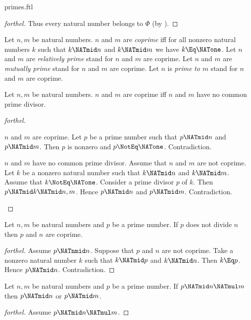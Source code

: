 \documentclass{stex}
\begin{document}
\begin{smodule}{primes.ftl}
\begin{proof}[forthel]
  Thus every natural number belongs to $\Phi$ (by ).
\end{proof}

\begin{definition}[forthel,for={coprime,relatively prime,mutually prime}]
  Let $n, m$ be natural numbers.
  $n$ and $m$ are \emph{coprime} iff for all nonzero natural numbers $k$ such that $k \NATmid n$ and $k \NATmid m$ we have $k \Eq \NATone$.
  Let $n$ and $m$ are \emph{relatively prime} stand for $n$ and $m$ are coprime.
  Let $n$ and $m$ are \emph{mutually prime} stand for $n$ and $m$ are coprime.
  Let $n$ is \emph{prime to $m$} stand for $n$ and $m$ are coprime.
\end{definition}

\begin{proposition}[forthel]
  Let $n, m$ be natural numbers.
  $n$ and $m$ are coprime iff $n$ and $m$ have no common prime divisor.
\end{proposition}
\begin{proof}[forthel]
  \begin{case}{$n$ and $m$ are coprime.}
    Let $p$ be a prime number such that $p \NATmid n$ and $p \NATmid m$.
    Then $p$ is nonzero and $p \NotEq \NATone$.
    Contradiction.
  \end{case}

  \begin{case}{$n$ and $m$ have no common prime divisor.}
    Assume that $n$ and $m$ are not coprime.
    Let $k$ be a nonzero natural number such that $k \NATmid n$ and $k \NATmid m$.
    Assume that $k \NotEq \NATone$.
    Consider a prime divisor $p$ of $k$.
    Then $p \NATmid k \NATmid n,m$.
    Hence $p \NATmid n$ and $p \NATmid m$.
    Contradiction.
  \end{case}
\end{proof}

\begin{proposition}[forthel]
  Let $n, m$ be natural numbers and $p$ be a prime number.
  If $p$ does not divide $n$ then $p$ and $n$ are coprime.
\end{proposition}
\begin{proof}[forthel]
  Assume $p \NATnmid n$.
  Suppose that $p$ and $n$ are not coprime.
  Take a nonzero natural number $k$ such that $k \NATmid p$ and $k \NATmid n$.
  Then $k \Eq p$.
  Hence $p \NATmid n$.
  Contradiction.
\end{proof}

\begin{proposition}[forthel]
  Let $n, m$ be natural numbers and $p$ be a prime number.
  If $p \NATmid n \NATmul m$ then $p \NATmid n$ or $p \NATmid m$.
\end{proposition}
\begin{proof}[forthel]
  Assume $p \NATmid n \NATmul m$.


\end{proof}
\end{smodule}
\end{document}
